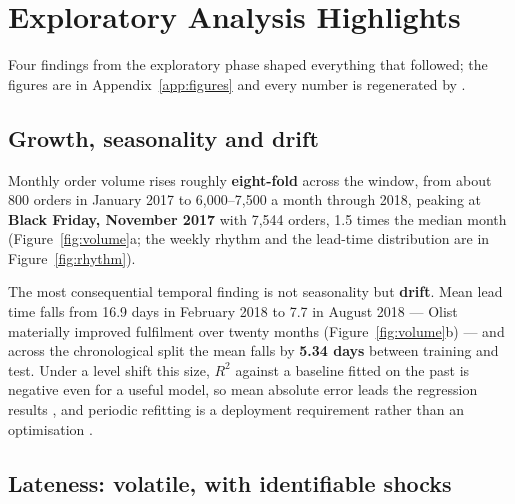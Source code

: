 \section{Exploratory Analysis Highlights}
\label{sec:eda}

Four findings from the exploratory phase shaped everything that followed; the
figures are in Appendix~\ref{app:figures} and every number is regenerated by
.

\subsection{Growth, seasonality and drift}
\label{sec:temporal}

Monthly order volume rises roughly \textbf{eight-fold} across the window, from
about 800 orders in January 2017 to 6{,}000--7{,}500 a month through 2018,
peaking at \textbf{Black Friday, November 2017} with 7{,}544 orders, 1.5 times
the median month (Figure~\ref{fig:volume}a; the weekly rhythm and the
lead-time distribution are in Figure~\ref{fig:rhythm}).

The most consequential temporal finding is not seasonality but \textbf{drift}.
Mean lead time falls from 16.9 days in February 2018 to 7.7 in August 2018 ---
Olist materially improved fulfilment over twenty months
(Figure~\ref{fig:volume}b) --- and across the chronological split the mean
falls by \textbf{5.34 days} between training and test. Under a level shift this
size, $R^2$ against a baseline fitted on the past is negative even for a useful
model, so mean absolute error leads the regression results
\citep{hyndman2006accuracy}, and periodic refitting is a deployment requirement
rather than an optimisation \citep{gama2014drift}.

\subsection{Lateness: volatile, with identifiable shocks}
\label{sec:eda-lateness}

